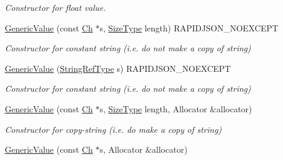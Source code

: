 \begin{DoxyCompactItemize}
\begin{DoxyCompactList}\small\item\em Constructor for float value. \end{DoxyCompactList}\item 
\hyperlink{classGenericValue_a4d9af98141360cd801daab4ed1ca2c91}{Generic\+Value} (const \hyperlink{classGenericValue_ade0e0ce64ccd5d852da57a35e720bafb}{Ch} $\ast$s, \hyperlink{rapidjson_8h_a5ed6e6e67250fadbd041127e6386dcb5}{Size\+Type} length) R\+A\+P\+I\+D\+J\+S\+O\+N\+\_\+\+N\+O\+E\+X\+C\+E\+PT\hypertarget{classGenericValue_a4d9af98141360cd801daab4ed1ca2c91}{}\label{classGenericValue_a4d9af98141360cd801daab4ed1ca2c91}

\begin{DoxyCompactList}\small\item\em Constructor for constant string (i.\+e. do not make a copy of string) \end{DoxyCompactList}\item 
\hyperlink{classGenericValue_abb2887958974fef1b2b5c8e32cc72ddb}{Generic\+Value} (\hyperlink{classGenericValue_a32e0f30ee278072374c8168b14d3317f}{String\+Ref\+Type} s) R\+A\+P\+I\+D\+J\+S\+O\+N\+\_\+\+N\+O\+E\+X\+C\+E\+PT\hypertarget{classGenericValue_abb2887958974fef1b2b5c8e32cc72ddb}{}\label{classGenericValue_abb2887958974fef1b2b5c8e32cc72ddb}

\begin{DoxyCompactList}\small\item\em Constructor for constant string (i.\+e. do not make a copy of string) \end{DoxyCompactList}\item 
\hyperlink{classGenericValue_a9ec2c7cda8c8845acfa3565c6b1b4e10}{Generic\+Value} (const \hyperlink{classGenericValue_ade0e0ce64ccd5d852da57a35e720bafb}{Ch} $\ast$s, \hyperlink{rapidjson_8h_a5ed6e6e67250fadbd041127e6386dcb5}{Size\+Type} length, Allocator \&allocator)\hypertarget{classGenericValue_a9ec2c7cda8c8845acfa3565c6b1b4e10}{}\label{classGenericValue_a9ec2c7cda8c8845acfa3565c6b1b4e10}

\begin{DoxyCompactList}\small\item\em Constructor for copy-\/string (i.\+e. do make a copy of string) \end{DoxyCompactList}\item 
\hyperlink{classGenericValue_a9b72b2e3347d4cd77b16c3b45e8decf1}{Generic\+Value} (const \hyperlink{classGenericValue_ade0e0ce64ccd5d852da57a35e720bafb}{Ch} $\ast$s, Allocator \&allocator)\hypertarget{classGenericValue_a9b72b2e3347d4cd77b16c3b45e8decf1}{}\label{classGenericValue_a9b72b2e3347d4cd77b16c3b45e8decf1}


\end{DoxyCompactItemize}
